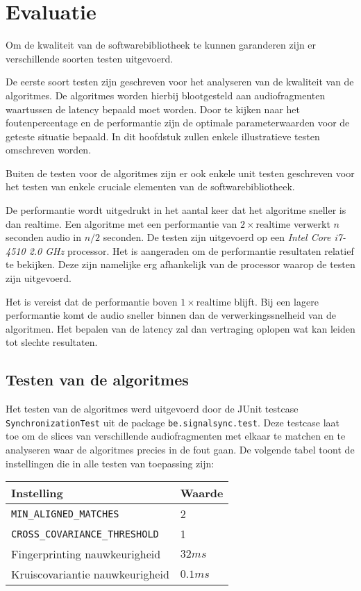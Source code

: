 \chapter{Evaluatie}
\label{evaluatie}

Om de kwaliteit van de softwarebibliotheek te kunnen garanderen zijn er verschillende soorten testen uitgevoerd. 

De eerste soort testen zijn geschreven voor het analyseren van de kwaliteit van de algoritmes. De algoritmes worden hierbij blootgesteld aan audiofragmenten waartussen de latency bepaald moet worden. Door te kijken naar het foutenpercentage en de performantie zijn de optimale parameterwaarden voor de geteste situatie bepaald. In dit hoofdstuk zullen enkele illustratieve testen omschreven worden.

Buiten de testen voor de algoritmes zijn er ook enkele unit testen geschreven voor het testen van enkele cruciale elementen van de softwarebibliotheek.

De performantie wordt uitgedrukt in het aantal keer dat het algoritme sneller is dan realtime. Een algoritme met een performantie van $ 2 \times \textrm{realtime} $ verwerkt $ n $ seconden audio in $ n/2 $ seconden. De testen zijn uitgevoerd op een \textit{Intel Core i7-4510 2.0 GHz} processor. Het is aangeraden om de performantie resultaten relatief te bekijken. Deze zijn namelijke erg afhankelijk van de processor waarop de testen zijn uitgevoerd.

Het is vereist dat de performantie boven $ 1 \times \textrm{realtime} $ blijft. Bij een lagere performantie komt de audio sneller binnen dan de verwerkingssnelheid van de algoritmen. Het bepalen van de latency zal dan vertraging oplopen wat kan leiden tot slechte resultaten.



\section{Testen van de algoritmes}
\label{algoritme-test}

Het testen van de algoritmes werd uitgevoerd door de JUnit testcase \texttt{SynchronizationTest} uit de package \texttt{be.signalsync.test}. Deze testcase laat toe om de slices van verschillende audiofragmenten met elkaar te matchen en te analyseren waar de algoritmes precies in de fout gaan. De volgende tabel toont de instellingen die in alle testen van toepassing zijn:

\begin{tabular}{ l  l}
	\hline
	\textbf{Instelling} & \textbf{Waarde} \\
	\hline
	\texttt{MIN\_ALIGNED\_MATCHES} & 2 \\
	\texttt{CROSS\_COVARIANCE\_THRESHOLD} & 1 \\
	Fingerprinting nauwkeurigheid & $32ms$ \\
	Kruiscovariantie nauwkeurigheid & $0.1ms$
\end{tabular}

